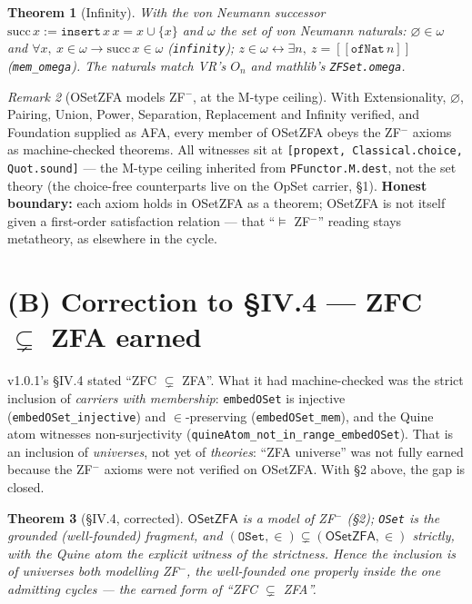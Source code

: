 \documentclass[11pt]{article}
\newtheorem{thm}{Theorem}[section]
\theoremstyle{remark}
\newtheorem{rem}[thm]{Remark}
\newcommand{\OSetZFA}{\textsf{OSetZFA}}
\newcommand{\OpSet}{\textsf{OpSet}}
\providecommand{\llbracket}{[\![}
\providecommand{\rrbracket}{]\!]}
\begin{document}
\begin{thm}[Infinity]
With the von Neumann successor $\mathrm{succ}\,x := \texttt{insert}\,x\,x = x\cup\{x\}$ and $\omega$
the set of von Neumann naturals: $\varnothing \in \omega$ and $\forall x,\ x \in \omega \to
\mathrm{succ}\,x \in \omega$ (\texttt{infinity}); $z \in \omega \leftrightarrow \exists n,\ z =
\llbracket\texttt{ofNat}\,n\rrbracket$ (\texttt{mem\_omega}). The naturals match VR's $O_n$ and
mathlib's \texttt{ZFSet.omega}.
\end{thm}

\begin{rem}[\OSetZFA{} models ZF$^-$, at the M-type ceiling]
With Extensionality, $\varnothing$, Pairing, Union, Power, Separation, Replacement and Infinity
verified, and Foundation supplied as AFA, every member of \OSetZFA{} obeys the ZF$^-$ axioms as
machine-checked theorems. All witnesses sit at \texttt{[propext, Classical.choice, Quot.sound]} --- the
M-type ceiling inherited from \texttt{PFunctor.M.dest}, not the set theory (the choice-free
counterparts live on the \OpSet{} carrier, \S1). \textbf{Honest boundary:} each axiom holds in
\OSetZFA{} as a theorem; \OSetZFA{} is not itself given a first-order satisfaction relation --- that
``$\models$ ZF$^-$'' reading stays metatheory, as elsewhere in the cycle.
\end{rem}

\section{(B) Correction to \S IV.4 --- ZFC $\subsetneq$ ZFA earned}

v1.0.1's \S IV.4 stated ``ZFC $\subsetneq$ ZFA''. What it had machine-checked was the strict inclusion
of \emph{carriers with membership}: \texttt{embedOSet} is injective (\texttt{embedOSet\_injective}) and
$\in$-preserving (\texttt{embedOSet\_mem}), and the Quine atom witnesses non-surjectivity
(\texttt{quineAtom\_not\_in\_range\_embedOSet}). That is an inclusion of \emph{universes}, not yet of
\emph{theories}: ``ZFA universe'' was not fully earned because the ZF$^-$ axioms were not verified on
\OSetZFA. With \S2 above, the gap is closed.

\begin{thm}[\S IV.4, corrected]
$\OSetZFA{}$ is a model of ZF$^-$ (\S2); \texttt{OSet} is the grounded (well-founded) fragment, and
$(\texttt{OSet},\in)\subsetneq(\OSetZFA,\in)$ strictly, with the Quine atom the explicit witness of the
strictness. Hence the inclusion is of \emph{universes both modelling ZF$^-$}, the well-founded one
properly inside the one admitting cycles --- the earned form of ``ZFC $\subsetneq$ ZFA''.
\end{thm}
\end{document}
